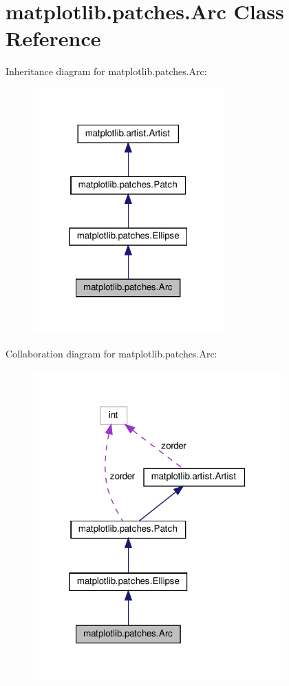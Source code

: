 \hypertarget{classmatplotlib_1_1patches_1_1Arc}{}\section{matplotlib.\+patches.\+Arc Class Reference}
\label{classmatplotlib_1_1patches_1_1Arc}


Inheritance diagram for matplotlib.\+patches.\+Arc\+:
\nopagebreak
\begin{figure}[H]
\begin{center}
\leavevmode
\includegraphics[width=208pt]{classmatplotlib_1_1patches_1_1Arc__inherit__graph}
\end{center}
\end{figure}


Collaboration diagram for matplotlib.\+patches.\+Arc\+:
\nopagebreak
\begin{figure}[H]
\begin{center}
\leavevmode
\includegraphics[width=271pt]{classmatplotlib_1_1patches_1_1Arc__coll__graph}
\end{center}
\end{figure}

